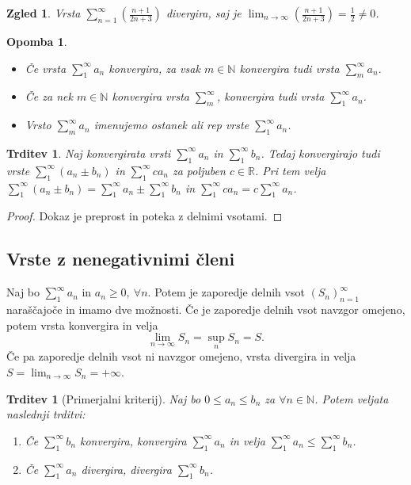 \documentclass[10pt, a4paper]{article}
\newtheorem{trditev}[izr]{Trditev}
\newtheorem*{opomba}{Opomba}
\newtheorem{zgled}[izr]{Zgled}
\newenvironment{noticeC}{%
  \tcolorbox[%
  notitle,
  empty,
  enhanced,  %
  breakable,
  coltext=black, 
  fontupper=\rmfamily,
  noparskip,
  sharp corners,
  boxrule=-1pt,  %
  frame hidden,
  left=7pt,  %
  right=7pt,
  top=5pt,
  bottom=5pt,
  before skip=2.5ex plus 2pt,
  after skip=2.5ex plus 2pt,
  overlay unbroken and last={%
  },
  ]}
{\endtcolorbox}
\newenvironment{dokaz}%
  {\begin{noticeC}\begin{proof}}%
  {\end{proof}\end{noticeC}}
\newcommand{\N}{\mathbb {N}}
\newcommand{\R}{\mathbb {R}}
\newcommand{\limzap}[1]{\lim_{n \to \infty} {#1}}
\begin{document}
\begin{zgled}
    Vrsta $\sum _{n=1} ^\infty \left(\frac{n+1}{2n + 3}\right)$ divergira, saj je $\limzap{\left(\frac{n+1}{2n + 3}\right)} = \frac{1}{2} \neq 0$.
\end{zgled}

\begin{opomba}
    \begin{itemize}
        \item Če vrsta $\sum_1 ^\infty a_n$ konvergira, za vsak $m \in \N$ konvergira tudi vrsta $\sum_m ^\infty a_n.$
        \item Če za nek $m \in \N$ konvergira vrsta $\sum_m ^\infty$, konvergira tudi vrsta $\sum_1 ^\infty a_n$.
        \item Vrsto $\sum_m ^\infty a_n$ imenujemo ostanek ali rep vrste $\sum_1 ^\infty a_n$.
    \end{itemize}
\end{opomba}

\begin{trditev}
    Naj konvergirata vrsti $\sum_1 ^\infty a_n$ in $\sum_1 ^\infty b_n$.
    Tedaj konvergirajo tudi vrste $\sum_1 ^\infty (a_n \pm b_n)$ in $\sum_1 ^\infty c a_n$ za poljuben $c \in \R$.
    Pri tem velja $\sum_1 ^\infty (a_n \pm b_n) = \sum_1 ^\infty a_n \pm \sum_1 ^\infty b_n$ in $\sum_1 ^\infty c a_n = c \sum_1 ^\infty a_n$. 
\end{trditev}

\begin{dokaz}
    Dokaz je preprost in poteka z delnimi vsotami.
\end{dokaz}

\subsection{Vrste z nenegativnimi členi}

Naj bo $\sum_1 ^\infty a_n$ in $a_n \geq 0,\ \forall n.$
Potem je zaporedje delnih vsot $(S_n)_{n=1} ^\infty$ naraščajoče in imamo dve možnosti.
Če je zaporedje delnih vsot navzgor omejeno, potem vrsta konvergira in velja $$\limzap{S_n} = \sup_n S_n = S.$$
Če pa zaporedje delnih vsot ni navzgor omejeno, vrsta divergira in velja $S = \limzap{S_n} = +\infty.$

\begin{trditev}[Primerjalni kriterij]
    Naj bo $0 \leq a_n \leq b_n$ za $\forall n \in \N$. Potem veljata naslednji trditvi:
    \begin{enumerate}
        \item Če $\sum_1 ^\infty b_n$ konvergira, konvergira $\sum_1 ^\infty a_n$ in velja $\sum_1 ^\infty a_n \leq \sum_1 ^\infty b_n$.
        \item Če $\sum_1 ^\infty a_n$ divergira, divergira $\sum_1 ^\infty b_n$.
    \end{enumerate}
\end{trditev}
\end{document}
